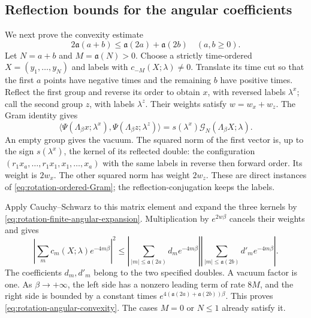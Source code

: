 \subsection{Reflection bounds for the angular coefficients}
\label{subsec:rotation-angular-reflections}

We next prove the convexity estimate
\begin{equation}\label{eq:rotation-angular-convexity}
 2\mathfrak a(a+b)\le\mathfrak a(2a)+\mathfrak a(2b)
                          \quad(a,b\ge0).
\end{equation}
Let $N=a+b$ and $M=\mathfrak a(N)>0$.
Choose a strictly time-ordered $X=(y_1,\ldots,y_N)$ and labels
with $c_{-M}(X;\lambda)\ne0$. Translate its time cut so that the
first $a$ points have negative times and the remaining $b$
have positive times. Reflect the first group and reverse its
order to obtain $x$, with reversed labels $\lambda^x$;
call the second group $z$, with labels $\lambda^z$.
Their weights satisfy $w=w_x+w_z$.
The Gram identity gives
\[
 \langle\Psi(\Lambda_\beta x;\lambda^x),
             \Psi(\Lambda_\beta z;\lambda^z)\rangle
       =s(\lambda^x)\mathcal G_N(\Lambda_\beta X;\lambda).
\]
An empty group gives the vacuum.
The squared norm of the first vector is, up to the sign
$s(\lambda^x)$, the kernel of its reflected double:
the configuration $(r_1x_a,\ldots,r_1x_1,x_1,\ldots,x_a)$
with the same labels in reverse then forward order.
Its weight is $2w_x$. The other squared norm has weight $2w_z$.
These are direct instances of
\eqref{eq:rotation-ordered-Gram}; the reflection-conjugation
keeps the labels.

Apply Cauchy--Schwarz to this matrix element and expand the
three kernels by \eqref{eq:rotation-finite-angular-expansion}.
Multiplication by $e^{2w\beta}$ cancels their weights and gives
\[
 \left|\sum_m c_m(X;\lambda)e^{-4m\beta}\right|^2
 \le
 \left|\sum_{|m|\le\mathfrak a(2a)}d_me^{-4m\beta}\right|
 \left|\sum_{|m|\le\mathfrak a(2b)}d'_me^{-4m\beta}\right|.
\]
The coefficients $d_m,d'_m$ belong to the two specified doubles.
A vacuum factor is one. As $\beta\to+\infty$, the left side
has a nonzero leading term of rate $8M$, and the right side is
bounded by a constant times
$e^{4(\mathfrak a(2a)+\mathfrak a(2b))\beta}$.
This proves \eqref{eq:rotation-angular-convexity}.
The cases $M=0$ or $N\le1$ already satisfy it.

